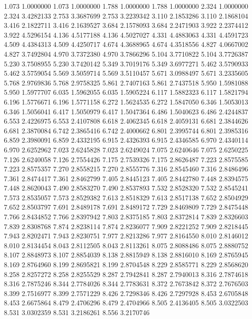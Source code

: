 1.073 1.0000000
1.073 1.0000000
1.788 1.0000000
1.788 1.0000000
2.324 1.0000000
2.324 3.4282133
2.753 3.3687699
2.753 3.2239342
3.110 2.1853286
3.110 2.1868104
3.416 2.1822711
3.416 2.1639527
3.684 2.1578093
3.684 2.2471903
3.922 2.2374412
3.922 4.5296154
4.136 4.5177188
4.136 4.5027027
4.331 4.4883063
4.331 4.4591723
4.509 4.4384313
4.509 4.4250717
4.674 4.3688965
4.674 4.3518556
4.827 4.0667002
4.827 3.7492804
4.970 3.7372380
4.970 3.7866296
5.104 3.7710822
5.104 3.7726387
5.230 3.7508955
5.230 3.7420142
5.349 3.7019176
5.349 3.6977271
5.462 3.5790933
5.462 3.5759054
5.569 3.5059714
5.569 3.5110457
5.671 3.0988497
5.671 3.2335605
5.768 2.9769836
5.768 2.9758325
5.861 2.7407163
5.861 2.7437518
5.950 1.5981088
5.950 1.5977707
6.035 1.5962055
6.035 1.5905224
6.117 1.5882323
6.117 1.5821794
6.196 1.5776671
6.196 1.5771158
6.272 1.5624535
6.272 1.5847050
6.346 1.5053013
6.346 1.5056041
6.417 1.5050979
6.417 1.5047364
6.486 1.5040623
6.486 2.4244837
6.553 2.4226975
6.553 2.4107808
6.618 2.4062345
6.618 2.4059131
6.681 2.3844626
6.681 2.3870084
6.742 2.3865416
6.742 2.4000662
6.801 2.3995744
6.801 2.3985316
6.859 2.3980091
6.859 2.4332195
6.915 2.4326393
6.915 2.4346585
6.970 2.4340114
6.970 2.6252962
7.023 2.6245828
7.023 2.6249024
7.075 2.6240646
7.075 2.6250225
7.126 2.6240058
7.126 2.7554426
7.175 2.7539326
7.175 2.8626487
7.223 2.8575585
7.223 2.8575357
7.270 2.8558215
7.270 2.8555776
7.316 2.8545460
7.316 2.8486496
7.361 2.8474417
7.361 2.8462799
7.405 2.8445123
7.405 2.8442780
7.448 2.8394575
7.448 2.8620043
7.490 2.8583270
7.490 2.8537893
7.532 2.8528320
7.532 2.8545241
7.573 2.8535057
7.573 2.8529382
7.613 2.8518329
7.613 2.8517138
7.652 2.8504929
7.652 2.8503797
7.691 2.8489178
7.691 2.8489172
7.729 2.8469809
7.729 2.8475448
7.766 2.8434852
7.766 2.8397942
7.803 2.8375185
7.803 2.8372814
7.839 2.8326603
7.839 2.8308768
7.874 2.8238114
7.874 2.8236077
7.909 2.8221252
7.909 2.8218445
7.943 2.8202471
7.943 2.8230751
7.977 2.8213286
7.977 2.8164550
8.010 2.8146012
8.010 2.8134454
8.043 2.8112505
8.043 2.8113261
8.075 2.8088486
8.075 2.8880752
8.107 2.8848973
8.107 2.8854039
8.138 2.8815949
8.138 2.8816010
8.169 2.8765945
8.169 2.8764960
8.199 2.8695821
8.199 2.8704548
8.229 2.8585771
8.229 2.8568620
8.258 2.8257272
8.258 2.8255529
8.287 2.7942841
8.287 2.7940013
8.316 2.7874618
8.316 2.7875246
8.344 2.7784026
8.344 2.7783631
8.372 2.7673842
8.372 2.7676503
8.399 2.7516977
8.399 2.7571229
8.426 2.7298346
8.426 2.7297928
8.453 2.6705848
8.453 2.6675864
8.479 2.4706296
8.479 2.4704966
8.505 2.4136405
8.505 3.0322503
8.531 3.0302359
8.531 3.2186261
8.556 3.2170746
